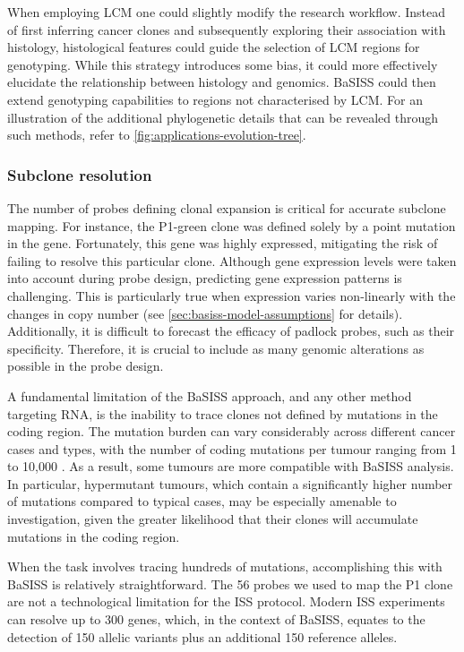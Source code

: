 When employing \ac{LCM} one could slightly modify the research workflow. Instead of first inferring cancer clones and subsequently exploring their association with histology, histological features could guide the selection of \ac{LCM} regions for genotyping. While this strategy introduces some bias, it could more effectively elucidate the relationship between histology and genomics. \ac{BaSISS} could then extend genotyping capabilities to regions not characterised by \ac{LCM}. For an illustration of the additional phylogenetic details that can be revealed through such methods, refer to \cref{fig:applications-evolution-tree}.

\subsubsection*{Subclone resolution}
The number of probes defining clonal expansion is critical for accurate subclone mapping. For instance, the P1-green clone  was defined solely by a point mutation in the  gene. Fortunately, this gene was highly expressed, mitigating the risk of failing to resolve this particular clone. Although gene expression levels were taken into account during probe design, predicting gene expression patterns is challenging. This is particularly true when expression varies non-linearly with the changes in copy number (see \cref{sec:basiss-model-assumptions} for details). Additionally, it is difficult to forecast the efficacy of padlock probes, such as their specificity. Therefore, it is crucial to include as many genomic alterations as possible in the probe design.

A fundamental limitation of the \ac{BaSISS} approach, and any other method targeting RNA, is the inability to trace clones not defined by mutations in the coding region. The mutation burden can vary considerably across different cancer cases and types, with the number of coding mutations per tumour ranging from 1 to 10,000 \parencite{Martincorena2015-br}. As a result, some tumours are more compatible with \ac{BaSISS} analysis. In particular, hypermutant tumours, which contain a significantly higher number of mutations compared to typical cases, may be especially amenable to investigation, given the greater likelihood that their clones will accumulate mutations in the coding region.

When the task involves tracing hundreds of mutations, accomplishing this with \ac{BaSISS} is relatively straightforward. The 56 probes we used to map the P1 clone are not a technological limitation for the \ac{ISS} protocol. Modern \ac{ISS} experiments can resolve up to 300 genes, which, in the context of \ac{BaSISS}, equates to the detection of 150 allelic variants plus an additional 150 reference alleles.

